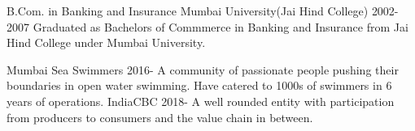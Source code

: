 \documentclass[11pt]{spidercv}
\begin{document}
\begin{MainPart}
    
    \Experience
        {\ColorHighlight}
		{B.Com. in Banking and Insurance}
		{Mumbai University(Jai Hind College)}
        {2002-2007}
        {   
            Graduated as Bachelors of Commmerce in Banking and Insurance from Jai Hind College under Mumbai University.
        }


    \Experience
        {\ColorHighlight}
		{Mumbai Sea Swimmers}
		{}
		{2016-\faUndo}
        {   
            A community of passionate people pushing their boundaries in open water swimming. Have catered to 1000s of swimmers in 6 years of operations.
        }
	\Experience
        {\ColorHighlight}
		{IndiaCBC}
		{}
		{2018-\faUndo}
        {   
            A well rounded entity with participation from producers to consumers and the value chain in between.
        }
        
    \end{MainPart}

    
\end{document}

